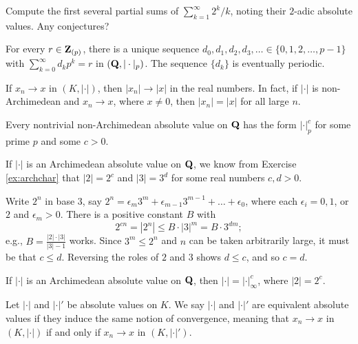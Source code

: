 \begin{prob}\label{prob:33} Compute the first several partial sums of $\sum_{k=1}^{\infty} 2^k/k$, noting their $2$-adic absolute values. Any conjectures?
\end{prob}

\begin{prob}\label{ex:rational}\label{prob:44} For every $r \in \mathbf{Z}_{(p)}$, there is a unique sequence $d_0, d_1, d_2, d_3, \ldots \in \{0,1,2,\dots,p-1\}$ with $\sum_{k=0}^{\infty} d_k p^k=r$ in $(\mathbf{Q},|\cdot|_{p})$. The sequence $\{d_k\}$ is eventually periodic.
\end{prob}

\begin{prob}\label{prob:limitabsvalue} If $x_n\to x$ in $(K,|\cdot|)$, then $|x_n|\to |x|$ in the real numbers. In fact, if $|\cdot|$ is non-Archimedean and $x_n\to x$, where $x\ne 0$, then $|x_n| =|x|$ for all large $n$. 
\end{prob}

\absval 


\begin{prob}\label{prob:45} Every nontrivial non-Archimedean absolute value on $\mathbf{Q}$ has the form $|\cdot|_{p}^{c}$ for some prime $p$ and some $c>0$. \end{prob}

\begin{prob}\label{prob:46} If $|\cdot|$ is an Archimedean absolute value on $\mathbf{Q}$, we know from Exercise \ref{ex:archchar} that $|2| = 2^{c}$ and $|3|=3^d$ for some real numbers $c,d  > 0$. 

Write $2^n$ in base $3$, say $2^n = \epsilon_m 3^m + \epsilon_{m-1} 3^{m-1}+ \dots + \epsilon_0$, where each $\epsilon_i = 0, 1$, or $2$ and $\epsilon_m  > 0$. There is a positive constant $B$ with 
\[ 2^{cn} = |2^n| \le B\cdot |3|^{m} = B\cdot 3^{dm}; \]
e.g., $B = \frac{|2|\cdot|3|}{|3|-1}$ works. Since $3^m \le 2^n$ and $n$ can be taken arbitrarily large, it must be that $c \le d$. Reversing the roles of $2$ and $3$  shows $d \le c$, and so $c=d$.
\end{prob}

\begin{prob}\label{prob:47} If $|\cdot|$ is an Archimedean absolute value on $\mathbf{Q}$, then $|\cdot| = |\cdot|_{\infty}^{c}$, where $|2|  = 2^{c}$. 
\end{prob}

Let $|\cdot|$ and $|\cdot|'$ be absolute values on $K$. We say $|\cdot|$ and $|\cdot|'$ are \textsf{equivalent absolute values} if they induce the same notion of convergence, meaning that $x_n \to x$ in $(K,|\cdot|)$ if and only if $x_n\to x$ in $(K,|\cdot|')$.

